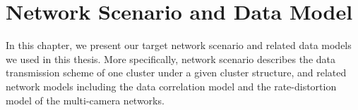 \section{Network Scenario and Data Model}
\label{sec::scenarioAndModel}
In this chapter, we present our target network scenario and related data models we used in this thesis.
More specifically, network scenario describes the data transmission scheme of one cluster under a given cluster structure, and related network models including the data correlation model and the rate-distortion model of the multi-camera networks.


